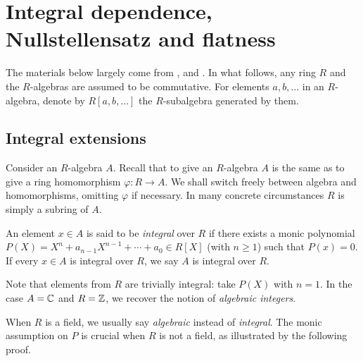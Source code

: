 
\chapter{Integral dependence, Nullstellensatz and flatness}

The materials below largely come from \cite[\S 4]{Eis95}, \cite[V.4]{AK70} and \cite[\S\S 5--6]{Mat80}. In what follows, any ring $R$ and the $R$-algebras are assumed to be commutative. For elements $a,b, \ldots$ in an $R$-algebra, denote by $R[a,b, \ldots]$ the $R$-subalgebra generated by them.

\section{Integral extensions}
Consider an $R$-algebra $A$. Recall that to give an $R$-algebra $A$ is the same as to give a ring homomorphism $\varphi: R \to A$. We shall switch freely between algebra and homomorphisms, omitting $\varphi$ if necessary. In many concrete circumstances $R$ is simply a subring of $A$.

\begin{definition}
	An element $x \in A$ is said to be \emph{integral} over $R$ if there exists a monic polynomial $P(X) = X^n + a_{n-1} X^{n-1} + \cdots + a_0 \in R[X]$ (with $n \geq 1$) such that $P(x)=0$. If every $x \in A$ is integral over $R$, we say $A$ is integral over $R$.
\end{definition}
Note that elements from $R$ are trivially integral: take $P(X)$ with $n=1$. In the case $A = \mathbb{C}$ and $R = \mathbb{Z}$, we recover the notion of \emph{algebraic integers}.

When $R$ is a field, we usually say \emph{algebraic} instead of \emph{integral}. The monic assumption on $P$ is crucial when $R$ is not a field, as illustrated by the following proof.

